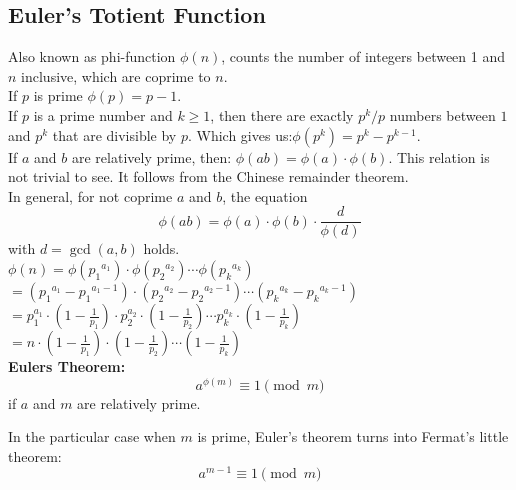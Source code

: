 \documentclass[8pt, a4paper, oneside, twocolumn]{extarticle}
\begin{document}
\subsection{Euler's Totient Function}
Also known as phi-function $\phi (n)$, counts the number of integers between 1 and $n$ inclusive, which are coprime to $n$.
\\If $p$ is prime $\phi (p) = p - 1.$
\\If $p$ is a prime number and $k \ge 1$, then there are exactly $p^k / p$ numbers between $1$ and $p^k$ that are divisible by $p$. Which gives us:$\phi(p^k) = p^k - p^{k-1}.$
\\If $a$ and $b$ are relatively prime, then: $\phi(a b) = \phi(a) \cdot \phi(b).$ This relation is not trivial to see. It follows from the Chinese remainder theorem.
\\In general, for not coprime $a$ and $b$, the equation $$\phi(ab) = \phi(a) \cdot \phi(b) \cdot \dfrac{d}{\phi(d)}$$ with $d = \gcd(a, b)$ holds.\\
$ \phi (n) = \phi ({p_1}^{a_1}) \cdot \phi ({p_2}^{a_2}) \cdots \phi ({p_k}^{a_k})$\\
$ = \left({p_1}^{a_1} - {p_1}^{a_1 - 1}\right) \cdot \left({p_2}^{a_2} - {p_2}^{a_2 - 1}\right) \cdots \left({p_k}^{a_k} - {p_k}^{a_k - 1}\right)$\\
$ = p_1^{a_1} \cdot \left(1 - \frac{1}{p_1}\right) \cdot p_2^{a_2} \cdot \left(1 - \frac{1}{p_2}\right) \cdots p_k^{a_k} \cdot \left(1 - \frac{1}{p_k}\right)$ \\ 
$= n \cdot \left(1 - \frac{1}{p_1}\right) \cdot \left(1 - \frac{1}{p_2}\right) \cdots \left(1 - \frac{1}{p_k}\right) $\\
\textbf{Eulers Theorem: }\\
$$a^{\phi(m)} \equiv 1 \pmod m$$ if $a$ and $m$ are relatively prime.

In the particular case when $m$ is prime, Euler's theorem turns into Fermat's little theorem: $$a^{m - 1} \equiv 1 \pmod m$$
\end{document}

